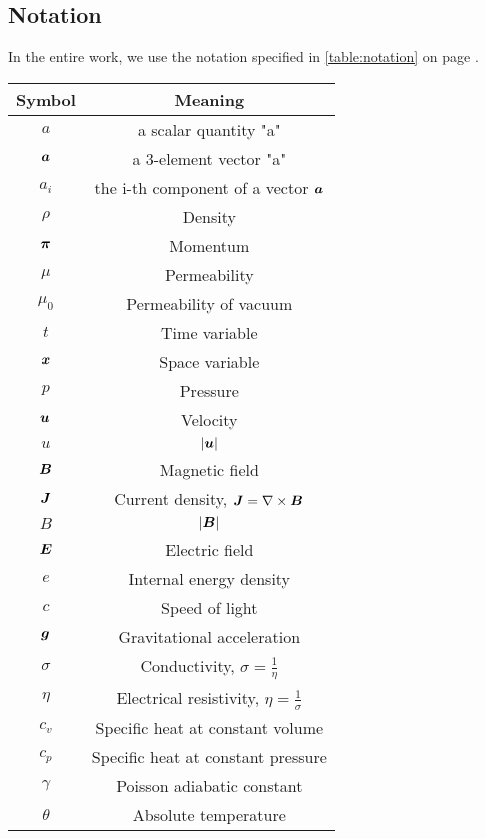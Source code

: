 \subsection{Notation}
In the entire work, we use the notation specified in \ref{table:notation} on page \pageref{table:notation}.

\begin{table}
    \centering
    \begin{tabular}{ |c|c| } 
        \hline
        Symbol & Meaning \\ 
        \hline
        $a$ & a scalar quantity "a"\\
        $\mbox{\boldmath $a$}$ & a 3-element vector "a"\\
        $a_i$ & the i-th component of a vector $\mbox{\boldmath $a$}$ \\
        \hline
        $\rho$ & Density \\ 
        $\mbox{\boldmath $\pi$}$ & Momentum \\ 
        $\mu$ & Permeability \\ 
        $\mu_0$ & Permeability of vacuum\\ 
        $t$ & Time variable\\ 
        $\mbox{\boldmath $x$}$ & Space variable \\ 
        $p$ & Pressure \\ 
        $\mbox{\boldmath $u$}$ & Velocity \\ 
        $u$ & $|\mbox{\boldmath $u$}|$ \\ 
        $\mbox{\boldmath $B$}$ & Magnetic field \\ 
        $\mbox{\boldmath $J$}$ & Current density, $\mbox{\boldmath $J$} = \nabla \times \mbox{\boldmath $B$}$ \\ 
        $B$ & $|\mbox{\boldmath $B$}|$ \\ 
        $\mbox{\boldmath $E$}$ & Electric field\\ 
        $e$ & Internal energy density \\ 
        $c$ & Speed of light\\ 
        $\mbox{\boldmath $g$}$ & Gravitational acceleration\\ 
        $\sigma$ & Conductivity, $\sigma = \frac{1}{\eta}$\\ 
        $\eta$ & Electrical resistivity, $\eta = \frac{1}{\sigma}$\\
        $c_v$ & Specific heat at constant volume\\
        $c_p$ & Specific heat at constant pressure\\
        $\gamma$ & Poisson adiabatic constant\\
        $\theta$ & Absolute temperature\\

\end{tabular}
\end{table}
